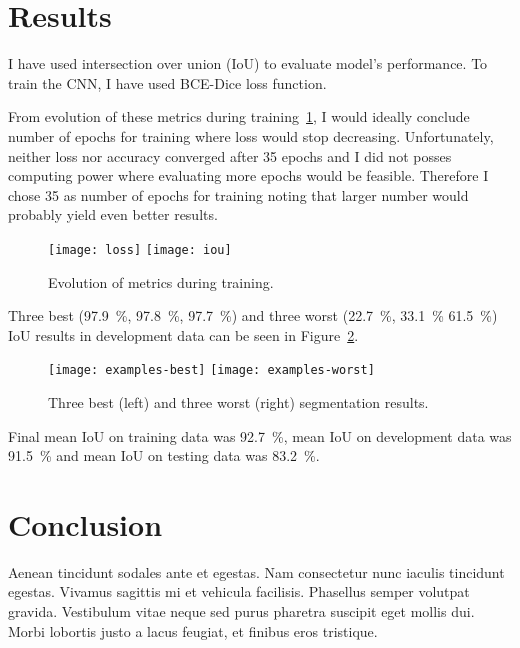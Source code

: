 \documentclass[9pt]{IEEEtran}
\begin{document}
\section{Results}
I have used intersection over union (IoU) to evaluate model's performance.
To train the CNN, I have used BCE-Dice loss function.

From evolution of these metrics during training~\ref{fig:evo}, I would ideally conclude number of epochs for training where loss would stop decreasing.
Unfortunately, neither loss nor accuracy converged after 35 epochs and I did not posses computing power where evaluating more epochs would be feasible.
Therefore I chose 35 as number of epochs for training noting that larger number would probably yield even better results.

\begin{figure}[h]
    \centering
    \texttt{[image: loss]}
    \texttt{[image: iou]}
    \caption{Evolution of metrics during training.}
    \label{fig:evo}
\end{figure}

Three best (97.9~\%, 97.8~\%, 97.7~\%) and three worst (22.7~\%, 33.1~\% 61.5~\%) IoU results in development data can be seen in Figure~\ref{fig:examples}.

\begin{figure}[h]
    \centering
    \texttt{[image: examples-best]}
    \texttt{[image: examples-worst]}
    \caption{Three best (left) and three worst (right) segmentation results.}
    \label{fig:examples}
\end{figure}

Final mean IoU on training data was 92.7~\%, mean IoU on development data was 91.5~\% and mean IoU on testing data was 83.2~\%.

\section{Conclusion}

Aenean tincidunt sodales ante et egestas. Nam consectetur nunc iaculis tincidunt egestas. Vivamus sagittis mi et vehicula facilisis. Phasellus semper volutpat gravida. Vestibulum vitae neque sed purus pharetra suscipit eget mollis dui. Morbi lobortis justo a lacus feugiat, et finibus eros tristique.



\end{document}
